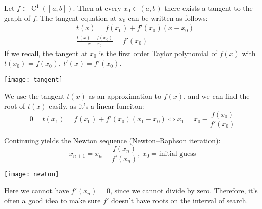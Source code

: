 \begin{definition}
    Let $f \in \operatorname{C}^1([a, b])$. Then at every 
    $x_0 \in (a, b)$ there exists a tangent to the graph of $f$.
    The tangent equation at $x_0$ can be written as follows:
    \begin{align*}
        &
        t(x) = f(x_0) + f'(x_0)(x - x_0)
        \\&
        \frac{t(x) - f(x_0)}{x - x_0} = f'(x_0)
    \end{align*}
    If we recall, the tangent at $x_0$ is the first order Taylor polynomial of $f(x)$
    with $t(x_0) = f(x_0),\ t'(x) = f'(x_0)$.
    \pagebreak
    \begin{figure*}[h]
        \centering
        \texttt{[image: tangent]}
    \end{figure*}

    We use the tangent $t(x)$ as an approximation to $f(x)$,
    and we can find the root of $t(x)$ easily, as it's a linear funciton:
    \[
        0 = t(x_1) = f(x_0) + f'(x_0)(x_1 - x_0) \Longleftrightarrow
        x_1 = x_0 - \frac{f(x_0)}{f'(x_0)}
    \]

    Continuing yields the Newton sequence (Newton–Raphson iteration):
    \[ x_{n + 1} = x_n - \frac{f(x_n)}{f'(x_n)},\ x_0 = \text{initial guess} \]

    \begin{figure*}[h]
        \centering
        \texttt{[image: newton]}
    \end{figure*}

    Here we cannot have $f'(x_n) = 0$, since we cannot divide by zero. Therefore,
    it's often a good idea to make sure $f'$ doesn't have roots on the interval
    of search.
\end{definition}
